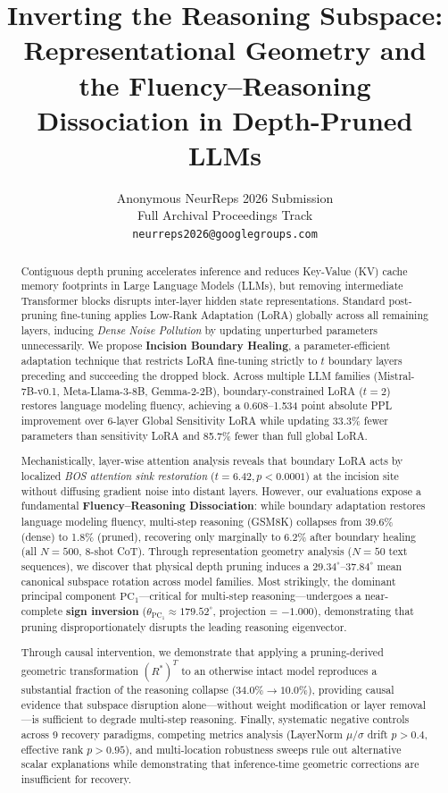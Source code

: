 \documentclass[11pt]{article}
\title{Inverting the Reasoning Subspace: Representational Geometry and the Fluency--Reasoning Dissociation in Depth-Pruned LLMs}
\author{
  Anonymous NeurReps 2026 Submission \\
  Full Archival Proceedings Track \\
  \texttt{neurreps2026@googlegroups.com}
}
\begin{document}
\maketitle

\begin{abstract}
Contiguous depth pruning accelerates inference and reduces Key-Value (KV) cache memory footprints in Large Language Models (LLMs), but removing intermediate Transformer blocks disrupts inter-layer hidden state representations. Standard post-pruning fine-tuning applies Low-Rank Adaptation (LoRA) globally across all remaining layers, inducing \textit{Dense Noise Pollution} by updating unperturbed parameters unnecessarily. We propose \textbf{Incision Boundary Healing}, a parameter-efficient adaptation technique that restricts LoRA fine-tuning strictly to $t$ boundary layers preceding and succeeding the dropped block. Across multiple LLM families (Mistral-7B-v0.1, Meta-Llama-3-8B, Gemma-2-2B), boundary-constrained LoRA ($t=2$) restores language modeling fluency, achieving a 0.608--1.534 point absolute PPL improvement over 6-layer Global Sensitivity LoRA while updating 33.3\% fewer parameters than sensitivity LoRA and 85.7\% fewer than full global LoRA.

Mechanistically, layer-wise attention analysis reveals that boundary LoRA acts by localized \textit{BOS attention sink restoration} ($t = 6.42, p < 0.0001$) at the incision site without diffusing gradient noise into distant layers. However, our evaluations expose a fundamental \textbf{Fluency--Reasoning Dissociation}: while boundary adaptation restores language modeling fluency, multi-step reasoning (GSM8K) collapses from 39.6\% (dense) to 1.8\% (pruned), recovering only marginally to 6.2\% after boundary healing (all $N=500$, 8-shot CoT). Through representation geometry analysis ($N=50$ text sequences), we discover that physical depth pruning induces a $29.34^\circ$--$37.84^\circ$ mean canonical subspace rotation across model families. Most strikingly, the dominant principal component $\mathrm{PC}_1$---critical for multi-step reasoning---undergoes a near-complete \textbf{sign inversion} ($\theta_{\mathrm{PC}_1} \approx 179.52^\circ$, projection = $-1.000$), demonstrating that pruning disproportionately disrupts the leading reasoning eigenvector.

Through causal intervention, we demonstrate that applying a pruning-derived geometric transformation $(R^*)^T$ to an otherwise intact model reproduces a substantial fraction of the reasoning collapse ($34.0\% \to 10.0\%$), providing causal evidence that subspace disruption alone---without weight modification or layer removal---is sufficient to degrade multi-step reasoning. Finally, systematic negative controls across 9 recovery paradigms, competing metrics analysis (LayerNorm $\mu/\sigma$ drift $p > 0.4$, effective rank $p > 0.95$), and multi-location robustness sweeps rule out alternative scalar explanations while demonstrating that inference-time geometric corrections are insufficient for recovery.
\end{abstract}
\end{document}
